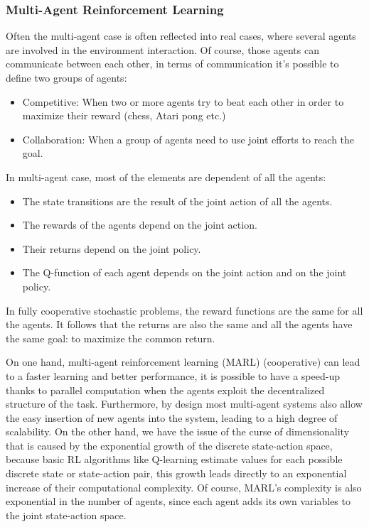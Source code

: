 \documentclass[12pt]{article}
\begin{document}
\subsubsection{Multi-Agent Reinforcement Learning}
Often the multi-agent case is often reflected into real cases, where several agents are involved in the environment interaction. Of course, those agents can communicate between each other, in terms of communication it's possible to define two groups of agents:
\begin{itemize}
    \item Competitive: When two or more agents try to beat each other in order to maximize their reward (chess, Atari pong etc.)
    \item Collaboration: When a group of agents need to use joint efforts to reach the goal.
\end{itemize}

In multi-agent case, most of the elements are dependent of all the agents:
\begin{itemize}
    \item The state transitions are the result of the joint action of all the agents.
    \item The rewards of the agents depend on the joint action.
    \item Their returns depend on the joint policy.
    \item The Q-function of each agent depends on the joint action and on the joint policy.
\end{itemize}

In fully cooperative stochastic problems, the reward functions are the same for all the agents. It follows that the returns are also the same and all the agents have the same goal: to maximize the common return.

On one hand, multi-agent reinforcement learning (MARL) (cooperative) can lead to a faster learning and better performance, it is possible to have a speed-up thanks to parallel computation when the agents exploit the decentralized structure of the task. Furthermore, by design most multi-agent systems also allow the easy insertion of new agents into the system, leading to a high degree of scalability. On the other hand, we have the issue of the curse of dimensionality that is caused by the exponential growth of the discrete state-action space, because basic RL algorithms like Q-learning estimate values for each possible discrete state or state-action pair, this growth leads directly to an exponential increase of their computational complexity. Of course, MARL's complexity is also exponential in the number of agents, since each agent adds its own variables to the joint state-action space. 
\end{document}
